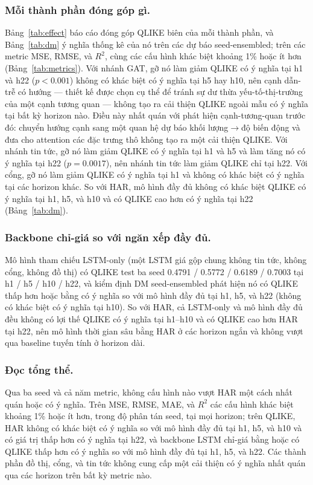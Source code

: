 \documentclass[runningheads]{llncs}
\begin{document}
\subsubsection{Mỗi thành phần đóng góp gì.}
Bảng~\ref{tab:effect} báo cáo đóng góp QLIKE biên của mỗi thành phần, và Bảng~\ref{tab:dm} ý nghĩa thống
kê của nó trên các dự báo seed-ensembled; trên các metric MSE, RMSE, và $R^2$, cùng các cấu hình khác
biệt khoảng 1\% hoặc ít hơn (Bảng~\ref{tab:metrics}). Với nhánh GAT, gỡ nó làm giảm QLIKE có ý nghĩa tại
h1 và h22 ($p<0.001$) không có khác biệt có ý nghĩa tại h5 hay h10, nên cạnh dẫn-trễ có hướng --- thiết
kế được chọn cụ thể để tránh sự dư thừa yếu-tố-thị-trường của một cạnh tương quan --- không tạo ra cải
thiện QLIKE ngoài mẫu có ý nghĩa tại bất kỳ horizon nào. Điều này nhất quán với phát hiện cạnh-tương-quan
trước đó: chuyển hướng cạnh sang một quan hệ dự báo khối lượng$\to$độ biến động và đưa cho attention các
đặc trưng thô không tạo ra một cải thiện QLIKE. Với nhánh tin tức, gỡ nó làm giảm QLIKE có ý nghĩa tại h1
và h5 và làm tăng nó có ý nghĩa tại h22 ($p=0.0017$), nên nhánh tin tức làm giảm QLIKE chỉ tại h22. Với
cổng, gỡ nó làm giảm QLIKE có ý nghĩa tại h1 và không có khác biệt có ý nghĩa tại các horizon khác. So
với HAR, mô hình đầy đủ không có khác biệt QLIKE có ý nghĩa tại h1, h5, và h10 và có QLIKE cao hơn có ý
nghĩa tại h22 (Bảng~\ref{tab:dm}).

\subsubsection{Backbone chỉ-giá so với ngăn xếp đầy đủ.}
Mô hình tham chiếu LSTM-only (một LSTM giá gộp chung không tin tức, không cổng, không đồ thị) có QLIKE
test ba seed 0.4791 / 0.5772 / 0.6189 / 0.7003 tại h1 / h5 / h10 / h22, và kiểm định DM seed-ensembled
phát hiện nó có QLIKE thấp hơn hoặc bằng có ý nghĩa so với mô hình đầy đủ tại h1, h5, và h22 (không có
khác biệt có ý nghĩa tại h10). So với HAR, cả LSTM-only và mô hình đầy đủ đều không có lợi thế QLIKE có ý
nghĩa tại h1--h10 và có QLIKE cao hơn HAR tại h22, nên mô hình thời gian sâu bằng HAR ở các horizon ngắn
và không vượt qua baseline tuyến tính ở horizon dài.

\subsubsection{Đọc tổng thể.}
Qua ba seed và cả năm metric, không cấu hình nào vượt HAR một cách nhất quán hoặc có ý nghĩa. Trên MSE,
RMSE, MAE, và $R^2$ các cấu hình khác biệt khoảng 1\% hoặc ít hơn, trong độ phân tán seed, tại mọi
horizon; trên QLIKE, HAR không có khác biệt có ý nghĩa so với mô hình đầy đủ tại h1, h5, và h10 và có giá
trị thấp hơn có ý nghĩa tại h22, và backbone LSTM chỉ-giá bằng hoặc có QLIKE thấp hơn có ý nghĩa so với
mô hình đầy đủ tại h1, h5, và h22. Các thành phần đồ thị, cổng, và tin tức không cung cấp một cải thiện có
ý nghĩa nhất quán qua các horizon trên bất kỳ metric nào.
\end{document}
